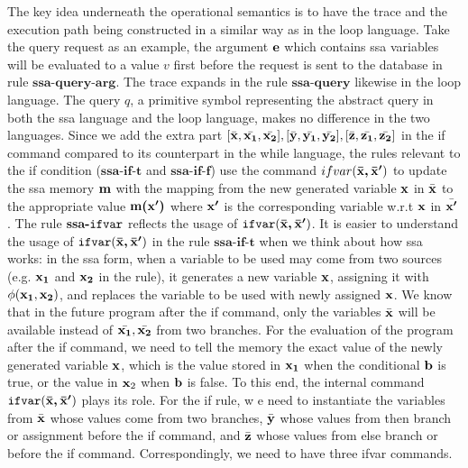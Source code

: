 \documentclass[a4paper,11pt]{article}
\begin{document}
{
The key idea underneath the operational semantics is to have the trace and the execution path being constructed in a similar way as in the loop language.
Take the query request as an example, the argument $\boldsymbol{\mathbf{e}}$ which contains ssa variables will be evaluated to a value $v$ first before the request is sent to the database in rule $\textbf{ssa-query-arg}$. 
The trace expands in the rule $\textbf{ssa-query}$ likewise in the loop language. 
The query $q$, a primitive symbol representing the abstract query in both the ssa language and  the loop language, makes no difference in the two languages. 
Since we add the extra part $[\bar{\boldsymbol{\mathbf{x}}}, \bar{\boldsymbol{\mathbf{x_1}}}, \bar{\boldsymbol{\mathbf{x_2}}}] ,[\bar{\boldsymbol{\mathbf{y}}}, \bar{\boldsymbol{\mathbf{y_1}}}, \bar{\boldsymbol{\mathbf{y_2}}}] ,[\bar{\boldsymbol{\mathbf{z}}},\bar{\boldsymbol{\mathbf{z_1}}}, \bar{\boldsymbol{\mathbf{z_2}}}]  $ 
in the if command compared to its counterpart in the while language, 
the rules relevant to the if condition ($\textbf{ssa-if-t}$ and $\textbf{ssa-if-f}$) use the command $ifvar(\boldsymbol{\mathbf{\bar{x}, \bar{x}'}})$ to update the ssa memory $\boldsymbol{\mathbf{m}}$ with the mapping from the new generated variable $\boldsymbol{\mathbf{x}}$ in $\bar{\boldsymbol{\mathbf{x}}}$ to the appropriate value $\boldsymbol{\mathbf{m(x')}}$ where $\boldsymbol{\mathbf{x'}}$ is the corresponding variable w.r.t $\boldsymbol{\mathbf{x}}$ in $\bar{\boldsymbol{\mathbf{x'}}}$.
%
The rule $\textbf{ssa-\ensuremath{\mathtt{ifvar}}}$ reflects the usage of $\mathtt{ifvar}(\boldsymbol{\mathbf{\bar{x}, \bar{x}'}})$.
%
It is easier to understand the usage of $\mathtt{ifvar}(\boldsymbol{\mathbf{\bar{x}, \bar{x}'}})$ in the rule $\textbf{ssa-if-t}$ when we think about how ssa works: 
in the ssa form, when a variable to be used may come from two sources (e.g. $\boldsymbol{\mathbf{x_1}}$ and $\boldsymbol{\mathbf{x_2}}$ in the rule), it generates a new variable $\boldsymbol{\mathbf{x}}$, assigning it with $\phi(\boldsymbol{\mathbf{x_1}}, \boldsymbol{\mathbf{x_2}})$,  and replaces the variable to be used with newly assigned $\boldsymbol{\mathbf{x}}$. 
We know that in the future program after the if command, 
only the variables $\bar{\boldsymbol{\mathbf{x}}}$ will be available instead of $\bar{\boldsymbol{\mathbf{x_1}}}, \bar{\boldsymbol{\mathbf{x_2}}}$ from two branches.
For the evaluation of the program after the if command, we need to tell the memory the exact value of the newly generated variable $\boldsymbol{\mathbf{x}}$, which is the value stored in $\boldsymbol{\mathbf{x_1}}$ when the conditional $\boldsymbol{\mathbf{b}}$ is true, 
or the value in $\boldsymbol{\mathbf{x}}_2$ when $\boldsymbol{\mathbf{b}}$ is false. To this end, the internal command $\mathtt{ifvar}(\boldsymbol{\mathbf{\bar{x}, \bar{x}'}})$ plays its role. 
For the if rule, w
e need to instantiate the variables from $\bar{\boldsymbol{\mathbf{x}}}$ whose values come from two branches, 
$\bar{\boldsymbol{\mathbf{y}}}$ whose values from then branch or assignment before the if command, and $\bar{\boldsymbol{\mathbf{z}}}$ whose values from else branch or before the if command. 
Correspondingly, we need to have three ifvar commands.   
}
\end{document}

